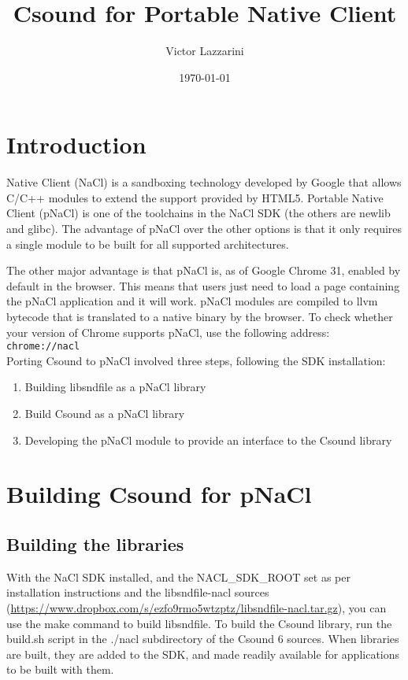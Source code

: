 \documentclass[11pt]{article}
\begin{document}
\title{Csound for Portable Native Client}
\author{Victor Lazzarini}
\date{\today}
\maketitle

\section{Introduction}

Native Client (NaCl) is a sandboxing technology developed by Google that allows C/C++ modules to extend the support provided
by HTML5. Portable Native Client (pNaCl) is one of the toolchains in the NaCl SDK (the others are newlib and glibc). The advantage
of pNaCl over the other options is that it only requires a single module to be built for all supported architectures.

The other major advantage is that pNaCl is, as of Google Chrome 31, enabled by default in the browser. This means that users
just need to load a page containing the pNaCl application and it will work. pNaCl modules are compiled to llvm bytecode that is 
translated to a native binary by the browser. To check whether your version of Chrome supports pNaCl, use the following address:
\\

 {\tt chrome://nacl }
\\

Porting Csound to pNaCl involved three steps, following the SDK installation:
\\
\begin{enumerate}
\item Building libsndfile as a pNaCl library
\item Build Csound as a pNaCl library
\item Developing the pNaCl module to provide an interface to the Csound library
\end{enumerate}


\section{Building Csound for pNaCl}

\subsection{Building the libraries}

With the NaCl SDK installed, and the NACL\_SDK\_ROOT set as per installation instructions and the libsndfile-nacl sources
(\url{https://www.dropbox.com/s/ezfo9rmo5wtzptz/libsndfile-nacl.tar.gz}),
you can use the make command to build libsndfile. To build the Csound library, run  the build.sh script in the ./nacl subdirectory 
of the Csound 6 sources. When libraries are built, they are added to the SDK, and made readily available for applications to be
built with them.
\end{document}
